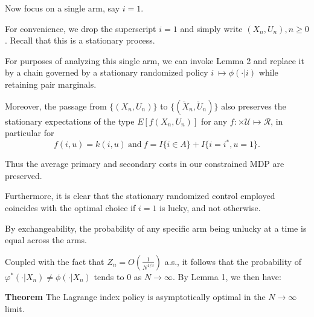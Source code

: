 \documentclass{slides}
\newcommand{\R}{\mathcal{R}}
\newcommand{\U}{\mathcal{U}}
\begin{document}
{\newpage

Now focus on a single arm, say $i=1$. 

For convenience, we drop the superscript $i=1$ and simply write $(X_n,U_n), n \geq 0$. Recall that this is a stationary process. 

For purposes of analyzing this single arm, we can invoke Lemma 2 and replace it by a chain governed by a stationary randomized policy $i \ \mapsto \phi(\cdot|i)$ while retaining pair marginals.

\newpage
 
Moreover, the passage from $\{(X_n,U_n)\}$ to $\{(\breve{X}_n, \breve{U}_n)\}$ also preserves the stationary expectations of the type $E[f(X_n,U_n)]$ for any $f: \times\U\mapsto\R$, in particular for $$f(i,u) = k(i,u) \  \mbox{and} \  f = I\{i\in A\}+I\{i = i^*, u = 1\}.$$ 

Thus the average primary and secondary costs in our constrained MDP are preserved. 

Furthermore, it is clear that the stationary randomized control employed coincides with the optimal choice if $i=1$ is lucky, and not otherwise.

\newpage

By exchangeability, the probability of any specific arm being unlucky at a time is equal across the arms. 

Coupled with the fact that $Z_n = O\left(\frac{1}{N^{1/3}}\right)$ a.s., it follows that the probability of $\varphi^*(\cdot|X_n) \neq \phi(\cdot|X_n)$ tends to $0$ as $N\to\infty$. By Lemma 1, we then have:

\textbf{Theorem} The Lagrange index policy is asymptotically optimal in the $N\to\infty$ limit. 
}

\newpage
\end{document}
